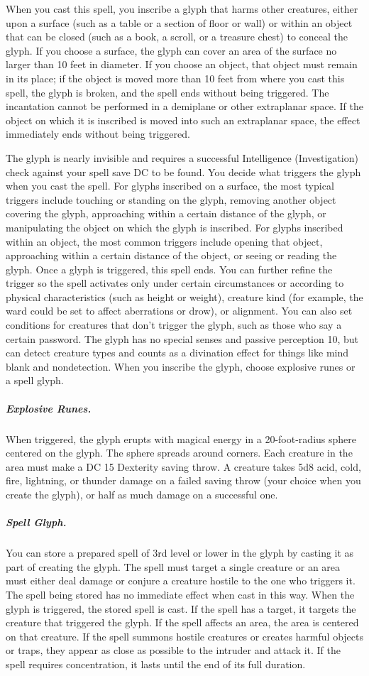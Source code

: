 When you cast this spell, you inscribe a glyph that harms other creatures, either upon a surface (such as a table or a section of floor or wall) or within an object that can be closed (such as a book, a scroll, or a treasure chest) to conceal the glyph. If you choose a surface, the glyph can cover an area of the surface no larger than 10 feet in diameter. If you choose an object, that object must remain in its place; if the object is moved more than 10 feet from where you cast this spell, the glyph is broken, and the spell ends without being triggered. The incantation cannot be performed in a demiplane or other extraplanar space. If the object on which it is inscribed is moved into such an extraplanar space, the effect immediately ends without being triggered.

The glyph is nearly invisible and requires a successful Intelligence (Investigation) check against your spell save DC to be found.
You decide what triggers the glyph when you cast the spell. For glyphs inscribed on a surface, the most typical triggers include touching or standing on the glyph, removing another object covering the glyph, approaching within a certain distance of the glyph, or manipulating the object on which the glyph is inscribed. For glyphs inscribed within an object, the most common triggers include opening that object, approaching within a certain distance of the object, or seeing or reading the glyph. Once a glyph is triggered, this spell ends.
You can further refine the trigger so the spell activates only under certain circumstances or according to physical characteristics (such as height or weight), creature kind (for example, the ward could be set to affect aberrations or drow), or alignment. You can also set conditions for creatures that don't trigger the glyph, such as those who say a certain password. The glyph has no special senses and passive perception 10, but can detect creature types and counts as a divination effect for things like mind blank and nondetection.
When you inscribe the glyph, choose explosive runes or a spell glyph.

\subparagraph*{Explosive Runes.} When triggered, the glyph erupts with magical energy in a 20-foot-radius sphere centered on the glyph. The sphere spreads around corners. Each creature in the area must make a DC 15 Dexterity saving throw. A creature takes 5d8 acid, cold, fire, lightning, or thunder damage on a failed saving throw (your choice when you create the glyph), or half as much damage on a successful one.

\subparagraph*{Spell Glyph.} You can store a prepared spell of 3rd level or lower in the glyph by casting it as part of creating the glyph. The spell must target a single creature or an area must either deal damage or conjure a creature hostile to the one who triggers it. The spell being stored has no immediate effect when cast in this way. When the glyph is triggered, the stored spell is cast. If the spell has a target, it targets the creature that triggered the glyph. If the spell affects an area, the area is centered on that creature. If the spell summons hostile creatures or creates harmful objects or traps, they appear as close as possible to the intruder and attack it. If the spell requires concentration, it lasts until the end of its full duration.

